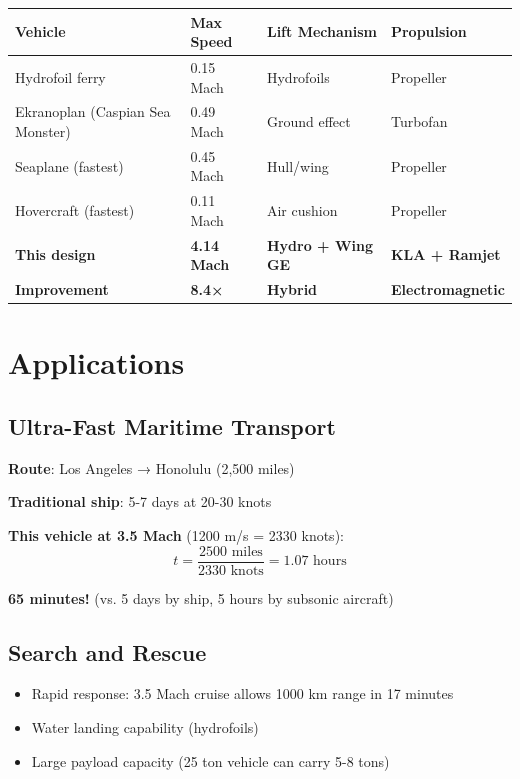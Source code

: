 \documentclass[12pt,a4paper]{article}
\begin{document}
\begin{center}
\begin{tabular}{|l|l|l|l|}
\hline
\textbf{Vehicle} & \textbf{Max Speed} & \textbf{Lift Mechanism} & \textbf{Propulsion} \\
\hline
Hydrofoil ferry & 0.15 Mach & Hydrofoils & Propeller \\
Ekranoplan (Caspian Sea Monster) & 0.49 Mach & Ground effect & Turbofan \\
Seaplane (fastest) & 0.45 Mach & Hull/wing & Propeller \\
Hovercraft (fastest) & 0.11 Mach & Air cushion & Propeller \\
\hline
\textbf{This design} & \textbf{4.14 Mach} & \textbf{Hydro + Wing GE} & \textbf{KLA + Ramjet} \\
\hline
\textbf{Improvement} & \textbf{8.4×} & \textbf{Hybrid} & \textbf{Electromagnetic} \\
\hline
\end{tabular}
\end{center}

\section{Applications}

\subsection{Ultra-Fast Maritime Transport}

\textbf{Route}: Los Angeles → Honolulu (2,500 miles)

\textbf{Traditional ship}: 5-7 days at 20-30 knots

\textbf{This vehicle at 3.5 Mach} (1200 m/s = 2330 knots):
\begin{equation}
t = \frac{2500 \text{ miles}}{2330 \text{ knots}} = 1.07 \text{ hours}
\end{equation}

\textbf{65 minutes!} (vs. 5 days by ship, 5 hours by subsonic aircraft)

\subsection{Search and Rescue}

\begin{itemize}
\item Rapid response: 3.5 Mach cruise allows 1000 km range in 17 minutes
\item Water landing capability (hydrofoils)
\item Large payload capacity (25 ton vehicle can carry 5-8 tons)
\end{itemize}
\end{document}
